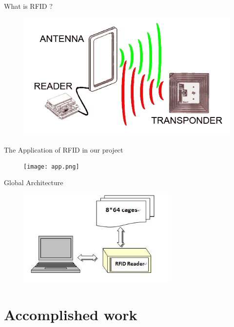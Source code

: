 \documentclass[utf8,compress]{beamer}
\begin{document}
\begin{frame}{What is RFID ?}
\begin{figure}[h]
    \center
    \includegraphics[width=\textwidth]{rfid.png}
\end{figure}
\end{frame}

\begin{frame}{The Application of RFID in our project}
\begin{figure}[h]
    \center
    \texttt{[image: app.png]}
\end{figure}
\end{frame}

\begin{frame}{Global Architecture}
\begin{figure}[h]
    \center
    \includegraphics[width=0.7\textwidth]{global_archi.jpg}
\end{figure}
 \end{frame}

\section{Accomplished work}
\end{document}
